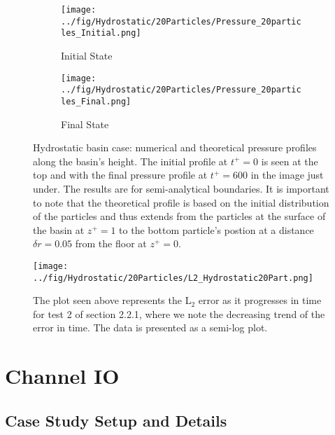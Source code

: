 \documentclass{../GPUSPHtemplate}
\begin{document}
\begin{figure}[H]
  \begin{subfigure}{.5\textwidth}
    \centering
    \texttt{[image: ../fig/Hydrostatic/20Particles/Pressure\_20particles\_Initial.png]}
    \vspace*{5pt}
    \caption{Initial State}
  \end{subfigure}%
  \begin{subfigure}{.5\textwidth}
    \centering 
    \texttt{[image: ../fig/Hydrostatic/20Particles/Pressure\_20particles\_Final.png]}
    \caption{Final State}        
  \end{subfigure}
  \caption{Hydrostatic basin case: numerical and theoretical pressure profiles along the basin's height.
    The initial profile at $t^+=0$ is seen at the top and with the final pressure profile at $t^+=600$ in the image just under.
    The results are for semi-analytical boundaries. It is important to note that the theoretical profile is
    based on the initial distribution of the particles and thus extends from the particles at the surface of the
    basin at $z^+=1$ to the bottom particle's postion at a distance $\delta r = 0.05 $ from the floor at $z^+=0$. }
  \label{fig:HydroExp2}
\end{figure}

\begin{figure}[H]
  \centering
  \texttt{[image: ../fig/Hydrostatic/20Particles/L2\_Hydrostatic20Part.png]}
  \caption{The plot seen above represents the L$_2$ error as it progresses in time for test 2 of section 2.2.1, where we note the decreasing trend of the error in time. The data is presented as a semi-log plot. }
  \label{fig:HydroExp2L2}
\end{figure}

\cleardoublepage

\section{Channel IO}

\subsection{Case Study Setup and Details}
   
\end{document}
